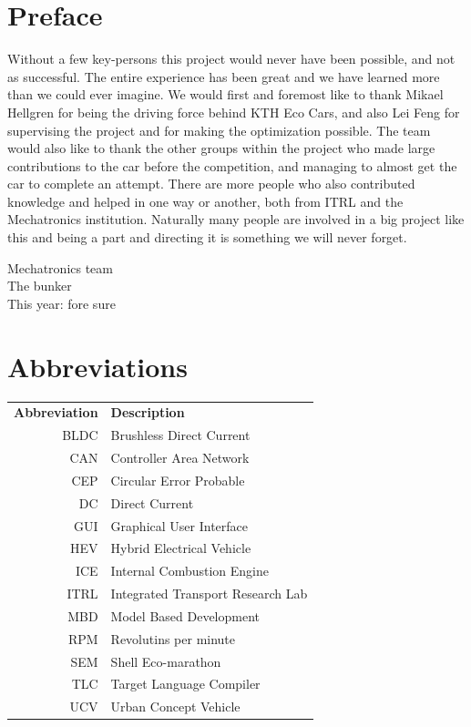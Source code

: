 \documentclass[a4paper, 12pt]{report}
\begin{document}
\chapter*{Preface}
Without a few key-persons this project would never have been possible, and not
as successful. The entire experience has been great and we have learned more
than we could ever imagine.  We would first and foremost like to thank Mikael Hellgren for
being the driving force behind KTH Eco Cars, and also Lei Feng for supervising the
project and for making the optimization possible.  The team would also like to
thank the other groups within the project who made large contributions to the car before the
competition, and managing to almost get the car to complete an attempt.  There
are more people who also contributed knowledge and helped in one way or another,
both from ITRL and the Mechatronics institution.  Naturally many people are
involved in a big project like this and being a part and directing it is
something we will never forget.

\begin{flushright}Mechatronics team \\ The bunker \\This year: fore sure \end{flushright}

\clearpage
\setcounter{tocdepth}{1}
\tableofcontents

\chapter*{Abbreviations}
\noindent{}\begin{tabular}{r  l}
\textbf{Abbreviation} 	& \textbf{Description} \vspace{.5em} \\
BLDC	&Brushless Direct Current\\
CAN	&Controller Area Network\\
CEP     &Circular Error Probable\\
DC	&Direct Current\\
GUI     &Graphical User Interface\\
HEV     &Hybrid Electrical Vehicle\\
ICE 	&Internal Combustion Engine\\
ITRL    &Integrated Transport Research Lab\\
MBD     &Model Based Development\\
RPM 	&Revolutins per minute\\
SEM	&Shell Eco-marathon\\
TLC	&Target Language Compiler\\
UCV     &Urban Concept Vehicle

\end{tabular}
\end{document}
